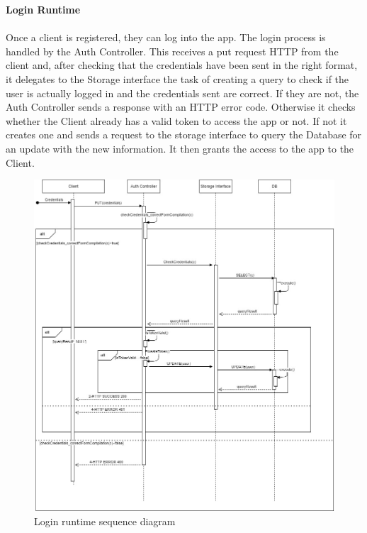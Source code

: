 \documentclass[a4paper, 12pt, oneside, table]{article}
\begin{document}
\textbf{Login Runtime}\\
\\
Once a client is registered, they can log into the app. The login process is handled by the Auth Controller. This receives a put request HTTP from the client and, after checking that the credentials have been sent in the right format, it delegates to the Storage interface the task of creating a query to check if the user is actually logged in and the credentials sent are correct. If they are not, the Auth Controller sends a response with an HTTP error code. Otherwise it checks whether the Client already has a valid token to access the app or not. If not it creates one and sends a request to the storage interface to query the Database for an update with the new information. It then grants the access to the app to the Client.
\begin{figure}[H]
\centering
	\centering
  	\includegraphics[height=0.5\textheight, scale=0.5, keepaspectratio]{img/seq_diag/Login_Runtime.jpg}
	\caption{Login runtime sequence diagram}
 	\label{logRunTime}
\end{figure}
\end{document}
